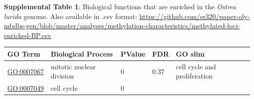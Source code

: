 \documentclass[
]{article}
\begin{document}
\textbf{Supplemental Table 1}: Biological functions that are enriched in
the \emph{Ostrea lurida} genome. Also available in .csv format:
\url{https://github.com/sr320/paper-oly-mbdbs-gen/blob/master/analyses/methylation-characteristics/methylated-loci-enriched-BP.csv}

\begin{longtable}[]{@{}lllll@{}}
\toprule
\begin{minipage}[b]{0.17\columnwidth}\raggedright
GO Term\strut
\end{minipage} & \begin{minipage}[b]{0.17\columnwidth}\raggedright
Biological Process\strut
\end{minipage} & \begin{minipage}[b]{0.17\columnwidth}\raggedright
PValue\strut
\end{minipage} & \begin{minipage}[b]{0.17\columnwidth}\raggedright
FDR\strut
\end{minipage} & \begin{minipage}[b]{0.17\columnwidth}\raggedright
GO slim\strut
\end{minipage}\tabularnewline
\midrule
\endhead
\begin{minipage}[t]{0.17\columnwidth}\raggedright
\url{GO:0007067}\strut
\end{minipage} & \begin{minipage}[t]{0.17\columnwidth}\raggedright
mitotic nuclear division\strut
\end{minipage} & \begin{minipage}[t]{0.17\columnwidth}\raggedright
0\strut
\end{minipage} & \begin{minipage}[t]{0.17\columnwidth}\raggedright
0.37\strut
\end{minipage} & \begin{minipage}[t]{0.17\columnwidth}\raggedright
cell cycle and proliferation\strut
\end{minipage}\tabularnewline
\begin{minipage}[t]{0.17\columnwidth}\raggedright
\url{GO:0007049}\strut
\end{minipage} & \begin{minipage}[t]{0.17\columnwidth}\raggedright
cell cycle\strut
\end{minipage} & \begin{minipage}[t]{0.17\columnwidth}\raggedright
0\strut
\end{minipage} & \begin{minipage}[t]{0.17\columnwidth}\raggedright

\end{minipage}
\end{longtable}
\end{document}
